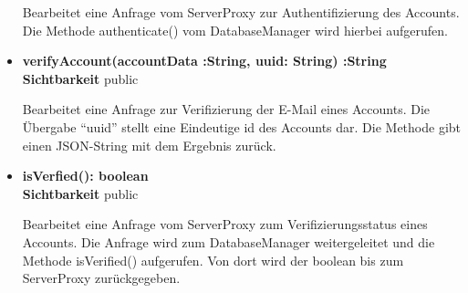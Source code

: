 \begin{itemize}
Bearbeitet eine Anfrage vom ServerProxy zur Authentifizierung des Accounts. Die Methode authenticate() vom DatabaseManager wird hierbei aufgerufen.
 
\item \textbf{verifyAccount(accountData :String, uuid: String) :String}\hfill\\
\textbf{Sichtbarkeit} public

Bearbeitet eine Anfrage zur Verifizierung der E-Mail eines Accounts. Die Übergabe ``uuid'' stellt eine Eindeutige id des Accounts dar. Die Methode gibt einen JSON-String mit dem Ergebnis zurück. 
 
\item \textbf{isVerfied(): boolean}\hfill\\
\textbf{Sichtbarkeit} public

Bearbeitet eine Anfrage vom ServerProxy zum Verifizierungsstatus eines Accounts. Die Anfrage wird zum DatabaseManager weitergeleitet und die Methode isVerified() aufgerufen. Von dort wird der boolean bis zum ServerProxy zurückgegeben.
\end{itemize}
